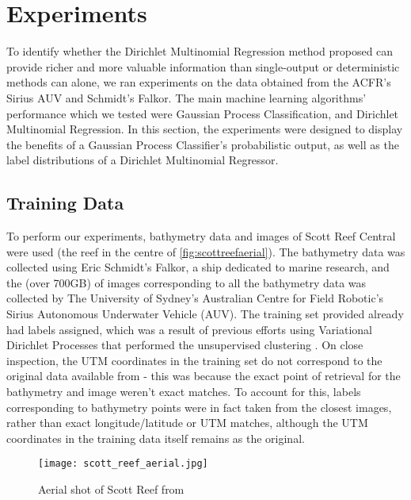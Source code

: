 \makeatletter
\renewcommand{\fnum@figure}{Figure \thefigure}
\makeatother

\chapter{Experiments} \label{chap:experiments}

To identify whether the Dirichlet Multinomial Regression method proposed can provide richer and more valuable information than single-output or deterministic methods can alone, we ran experiments on the data obtained from the ACFR's Sirius AUV and Schmidt's Falkor. The main machine learning algorithms' performance which we tested were Gaussian Process Classification, and Dirichlet Multinomial Regression. In this section, the experiments were designed to display the benefits of a Gaussian Process Classifier's probabilistic output, as well as the label distributions of a Dirichlet Multinomial Regressor.

\section{Training Data}
To perform our experiments, bathymetry data and images of Scott Reef Central were used (the reef in the centre of \autoref{fig:scottreefaerial}). The bathymetry data was collected using Eric Schmidt's Falkor, a ship dedicated to marine research, and the (over 700GB) of images corresponding to all the bathymetry data was collected by The University of Sydney's Australian Centre for Field Robotic's Sirius Autonomous Underwater Vehicle (AUV). The training set provided already had labels assigned, which was a result of previous efforts using Variational Dirichlet Processes that performed the unsupervised clustering \citep{steinberg11}. On close inspection, the UTM coordinates in the training set do not correspond to the original data available from \cite{squidle} - this was because the exact point of retrieval for the bathymetry and image weren't exact matches. To account for this, labels corresponding to bathymetry points were in fact taken from the closest images, rather than exact longitude/latitude or UTM matches, although the UTM coordinates in the training data itself remains as the original.


\begin{figure}
    \texttt{[image: scott\_reef\_aerial.jpg]}
    \caption{Aerial shot of Scott Reef from \cite{NASA:SRI}}
    \label{fig:scottreefaerial}
\end{figure}


